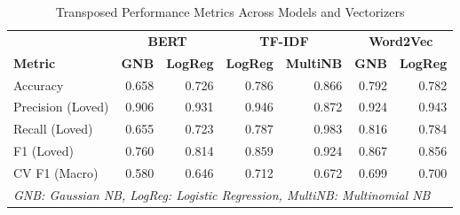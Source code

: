\documentclass{article}
\begin{document}
\begin{table}[h!]
\centering
\caption{Transposed Performance Metrics Across Models and Vectorizers}
\label{tab:model_performance_transposed}
\fontsize{7pt}{12pt}\selectfont
\begin{tabular}{lrrrrrr}
\toprule
& \multicolumn{2}{c}{\textbf{BERT}} & \multicolumn{2}{c}{\textbf{TF-IDF}} & \multicolumn{2}{c}{\textbf{Word2Vec}} \\
\cmidrule(lr){2-3} \cmidrule(lr){4-5} \cmidrule(lr){6-7}
\textbf{Metric} & \textbf{GNB} & \textbf{LogReg} & \textbf{LogReg} & \textbf{MultiNB} & \textbf{GNB} & \textbf{LogReg} \\
\midrule
Accuracy & 0.658 & 0.726 & 0.786 & 0.866 & 0.792 & 0.782 \\
Precision (Loved) & 0.906 & 0.931 & 0.946 & 0.872 & 0.924 & 0.943 \\
Recall (Loved) & 0.655 & 0.723 & 0.787 & 0.983 & 0.816 & 0.784 \\
F1 (Loved) & 0.760 & 0.814 & 0.859 & 0.924 & 0.867 & 0.856 \\
CV F1 (Macro) & 0.580 & 0.646 & 0.712 & 0.672 & 0.699 & 0.700 \\
\bottomrule
\multicolumn{7}{l}{\textit{GNB: Gaussian NB, LogReg: Logistic Regression, MultiNB: Multinomial NB}}
\end{tabular}
\end{table}
\end{document}
